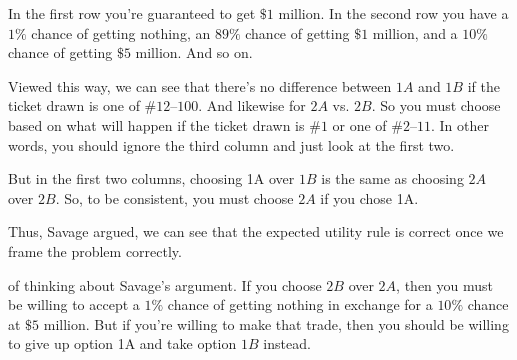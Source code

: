\documentclass[justified]{tufte-book}
\theoremstyle{definition}
\theoremstyle{definition}
\theoremstyle{definition}
\theoremstyle{remark}
\begin{document}
In the first row you're guaranteed to get \(\$1\) million. In the second
row you have a \(1\%\) chance of getting nothing, an \(89\%\) chance of
getting \(\$1\) million, and a \(10\%\) chance of getting \(\$5\)
million. And so on.

Viewed this way, we can see that there's no difference between \(1A\)
and \(1B\) if the ticket drawn is one of \(\#12\)--\(100\). And likewise
for \(2A\) vs. \(2B\). So you must choose based on what will happen if
the ticket drawn is \(\#1\) or one of \(\#2\)--\(11\). In other words,
you should ignore the third column and just look at the first two.

But in the first two columns, choosing 1A over \(1B\) is the same as
choosing \(2A\) over \(2B\). So, to be consistent, you must choose
\(2A\) if you chose 1A.

Thus, Savage argued, we can see that the expected utility rule is
correct once we frame the problem correctly.

 of thinking about Savage's argument. If
you choose \(2B\) over \(2A\), then you must be willing to accept a
\(1\%\) chance of getting nothing in exchange for a \(10\%\) chance at
\(\$5\) million. But if you're willing to make that trade, then you
should be willing to give up option 1A and take option \(1B\) instead.
\end{document}
